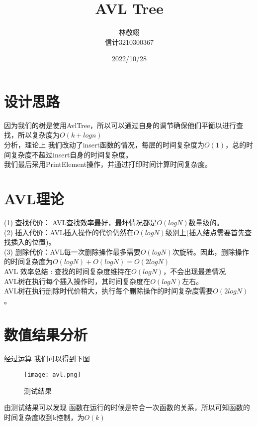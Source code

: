 \documentclass[a4paper]{ctexart}
\title{AVL Tree}
\author{林敬翊\\信计3210300367}
\date{2022/10/28}
\begin{document}
\maketitle
\pagestyle{empty}

\section{设计思路}

因为我们的树是使用AvlTree，所以可以通过自身的调节确保他们平衡以进行查找，所以复杂度为$O(k+logn)$\\

分析，理论上 我们改动了insert函数的情况，每层的时间复杂度为$O(1)$，总的时间复杂度不超过insert自身的时间复杂度。\\

我们最后采用PrintElement操作，并通过打印时间计算时间复杂度。\\
\section{AVL理论}

(1) 查找代价： AVL查找效率最好，最坏情况都是$O(logN)$数量级的。\\

(2) 插入代价：AVL插入操作的代价仍然在$O(logN)$级别上(插入结点需要首先查找插入的位置)。\\

(3) 删除代价：AVL每一次删除操作最多需要$O(logN)$次旋转。因此，删除操作的时间复杂度为$O(logN)+O(logN)=O(2logN)$\\

AVL 效率总结 : 查找的时间复杂度维持在$O(logN)$，不会出现最差情况\\

AVL树在执行每个插入操作时，其时间复杂度在$O(logN)$左右。\\

AVL树在执行删除时代价稍大，执行每个删除操作的时间复杂度需要$O(2logN)$。\\

\section{数值结果分析}
经过运算 我们可以得到下图\\

\begin{figure}[H]
  \texttt{[image: avl.png]}
  \caption{测试结果}
\end{figure}

由测试结果可以发现 函数在运行的时候是符合一次函数的关系，所以可知函数的时间复杂度收到k控制，为$O(k)$
\end{document}
